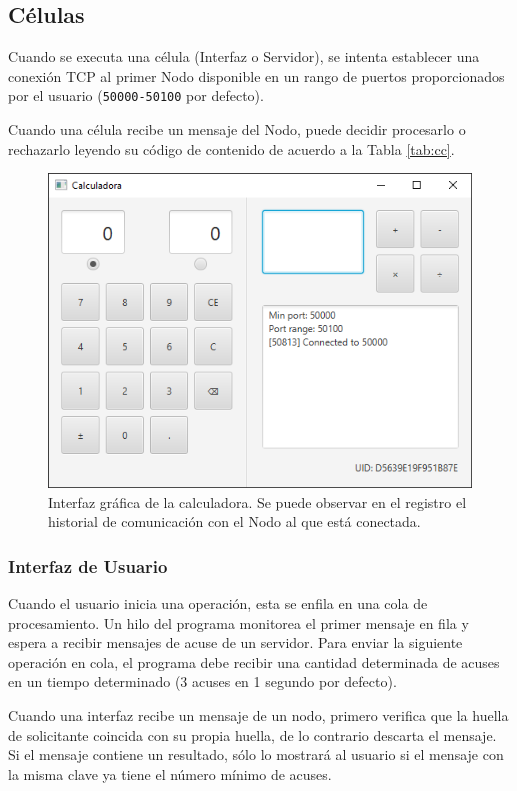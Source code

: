 \documentclass[conference,compsoc]{IEEEtran}
\begin{document}
\subsection{Células}

Cuando se executa una célula (Interfaz o Servidor), se intenta establecer una conexión TCP al primer Nodo disponible en un rango de puertos proporcionados por el usuario (\texttt{50000-50100} por defecto).

Cuando una célula recibe un mensaje del Nodo, puede decidir procesarlo o rechazarlo leyendo su código de contenido de acuerdo a la Tabla \ref{tab:cc}.

\begin{figure}[hbt]
    \centering
    \includegraphics[width=0.9\columnwidth]{demo.png}
    \caption{Interfaz gráfica de la calculadora. Se puede observar en el registro el historial de comunicación con el Nodo al que está conectada.}
    \label{fig:demo}
\end{figure}

\subsubsection{Interfaz de Usuario}

Cuando el usuario inicia una operación, esta se enfila en una cola de procesamiento. Un hilo del programa monitorea el primer mensaje en fila y espera a recibir mensajes de acuse de un servidor. Para enviar la siguiente operación en cola, el programa debe recibir una cantidad determinada de acuses en un tiempo determinado (3 acuses en 1 segundo por defecto).

Cuando una interfaz recibe un mensaje de un nodo, primero verifica que la huella de solicitante coincida con su propia huella, de lo contrario descarta el mensaje.
Si el mensaje contiene un resultado, sólo lo mostrará al usuario si el mensaje con la misma clave ya tiene el número mínimo de acuses.
\end{document}
